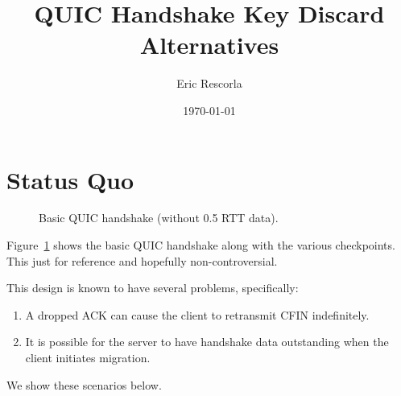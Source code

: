 \documentclass{article}
\title{QUIC Handshake Key Discard Alternatives}
\author{Eric Rescorla}
\date{\today}
\begin{document}
\maketitle

\section{Status Quo}
\label{sec:status-quo}


\begin{figure}[H]
\begin{center}
\end{center}
\caption{Basic QUIC handshake (without 0.5 RTT data).}
\label{fig:basic-handshake}
\end{figure}

Figure~\ref{fig:basic-handshake} shows the basic QUIC handshake along
with the various checkpoints. This just for reference and hopefully
non-controversial.

This design is known to have several problems, specifically:

\begin{enumerate}
\item A dropped ACK can cause the client to retransmit CFIN
  indefinitely.
\item It is possible for the server to have handshake data
  outstanding when the client initiates migration. 
\end{enumerate}

We show these scenarios below.
\end{document}
